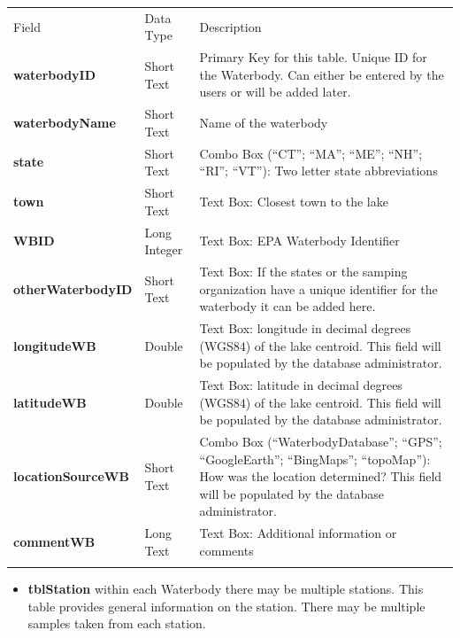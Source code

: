 \documentclass[]{article}
\begin{document}
\begin{longtable}[c]{@{}lll@{}}
\toprule\addlinespace
Field & Data Type & Description
\\\addlinespace
\midrule\endhead
\textbf{waterbodyID} & Short Text & Primary Key for this table. Unique
ID for the Waterbody. Can either be entered by the users or will be
added later.
\\\addlinespace
\textbf{waterbodyName} & Short Text & Name of the waterbody
\\\addlinespace
\textbf{state} & Short Text & Combo Box (``CT''; ``MA''; ``ME''; ``NH'';
``RI''; ``VT''): Two letter state abbreviations
\\\addlinespace
\textbf{town} & Short Text & Text Box: Closest town to the lake
\\\addlinespace
\textbf{WBID} & Long Integer & Text Box: EPA Waterbody Identifier
\\\addlinespace
\textbf{otherWaterbodyID} & Short Text & Text Box: If the states or the
samping organization have a unique identifier for the waterbody it can
be added here.
\\\addlinespace
\textbf{longitudeWB} & Double & Text Box: longitude in decimal degrees
(WGS84) of the lake centroid. This field will be populated by the
database administrator.
\\\addlinespace
\textbf{latitudeWB} & Double & Text Box: latitude in decimal degrees
(WGS84) of the lake centroid. This field will be populated by the
database administrator.
\\\addlinespace
\textbf{locationSourceWB} & Short Text & Combo Box
(``WaterbodyDatabase''; ``GPS''; ``GoogleEarth''; ``BingMaps'';
``topoMap''): How was the location determined? This field will be
populated by the database administrator.
\\\addlinespace
\textbf{commentWB} & Long Text & Text Box: Additional information or
comments
\\\addlinespace
\bottomrule
\end{longtable}

\begin{itemize}
\itemsep1pt\parskip0pt
\item
  \textbf{tblStation} within each Waterbody there may be multiple
  stations. This table provides general information on the station.
  There may be multiple samples taken from each station.
\end{itemize}
\end{document}
